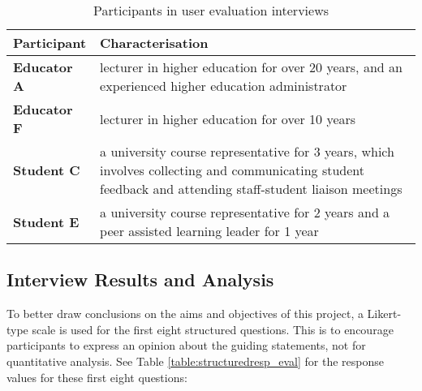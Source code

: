 \begin{table}[!h]
	\caption{Participants in user evaluation interviews}
	\centering
	\label{table:participants-eval}
	\begin{tabularx}{\textwidth}{>{\bfseries}lX}
		Participant & Characterisation                                                                    \\
		\toprule
		Educator A  & lecturer in higher education for over 20 years, and an experienced higher education
		administrator                                                                                     \\\midrule
		Educator F  & lecturer in higher education for over 10 years                                      \\\midrule
		Student C   & a university course representative for 3 years, which involves collecting and
		communicating student feedback and attending staff-student liaison meetings                       \\\midrule
		Student E   & a university course representative for 2 years and a peer assisted learning leader
		for 1 year                                                                                        \\\bottomrule
	\end{tabularx}
\end{table}

\subsection{Interview Results and Analysis}

To better draw conclusions on the aims and objectives of this project, a Likert-type scale is used
for the first eight structured questions. This is to encourage participants to express an opinion about the guiding statements,
not for quantitative analysis. See Table \ref{table:structuredresp_eval} for the response values for these first eight questions:

